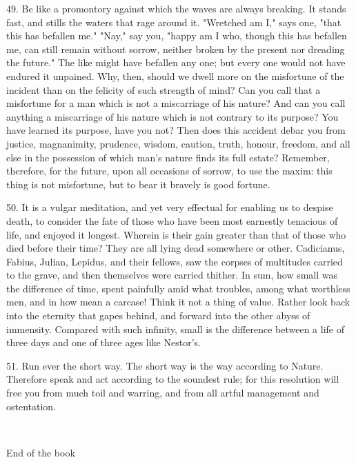 \documentclass{book}
\newcommand\terminus[1]{\vspace{2em}\emph{#1} \\[2em] \begin{center}End of the \ordinalstring{chapter} book\end{center}}
\begin{document}
49. Be like a promontory against which the waves are always
breaking. It stands fast, and stills the waters that rage around
it. "Wretched am I," says one, "that this has befallen me." "Nay," say
you, "happy am I who, though this has befallen me, can still remain
without sorrow, neither broken by the present nor dreading the
future." The like might have befallen any one; but every one would not
have endured it unpained. Why, then, should we dwell more on the
misfortune of the incident than on the felicity of such strength of
mind? Can you call that a misfortune for a man which is not a
miscarriage of his nature?  And can you call anything a miscarriage of
his nature which is not contrary to its purpose? You have learned its
purpose, have you not?  Then does this accident debar you from
justice, magnanimity, prudence, wisdom, caution, truth, honour,
freedom, and all else in the possession of which man's nature finds
its full estate? Remember, therefore, for the future, upon all
occasions of sorrow, to use the maxim: this thing is not misfortune,
but to bear it bravely is good fortune.

50. It is a vulgar meditation, and yet very effectual for enabling us
to despise death, to consider the fate of those who have been most
earnestly tenacious of life, and enjoyed it longest. Wherein is their
gain greater than that of those who died before their time? They are
all lying dead somewhere or other. Cadicianus, Fabius, Julian,
Lepidus, and their fellows, saw the corpses of multitudes carried to
the grave, and then themselves were carried thither. In sum, how small
was the difference of time, spent painfully amid what troubles, among
what worthless men, and in how mean a carcase! Think it not a thing of
value. Rather look back into the eternity that gapes behind, and
forward into the other abyss of immensity. Compared with such
infinity, small is the difference between a life of three days and one
of three ages like Nestor's.

51. Run ever the short way. The short way is the way according to
Nature. Therefore speak and act according to the soundest rule; for
this resolution will free you from much toil and warring, and from all
artful management and ostentation.

\terminus{}

\chapter[In the morning,...]{}
\end{document}
